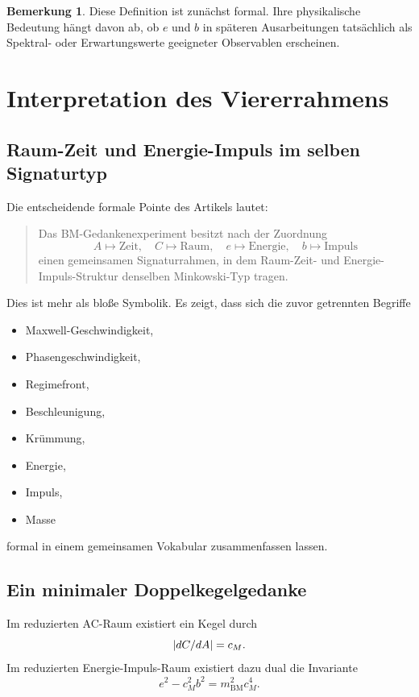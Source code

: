 \documentclass[11pt,a4paper]{article}
\theoremstyle{definition}
\newtheorem{bemerkung}[definition]{Bemerkung}
\theoremstyle{plain}
\begin{document}
	\begin{bemerkung}
		Diese Definition ist zunächst formal. Ihre physikalische Bedeutung hängt davon ab, ob $e$ und $b$ in späteren Ausarbeitungen tatsächlich als Spektral- oder Erwartungswerte geeigneter Observablen erscheinen.
	\end{bemerkung}
	
	\section{Interpretation des Viererrahmens}
	
	\subsection{Raum-Zeit und Energie-Impuls im selben Signaturtyp}
	
	Die entscheidende formale Pointe des Artikels lautet:
	\begin{quote}
		Das BM-Gedankenexperiment besitzt nach der Zuordnung
		\[
		A\mapsto \text{Zeit},\quad C\mapsto \text{Raum},\quad e\mapsto \text{Energie},\quad b\mapsto \text{Impuls}
		\]
		einen gemeinsamen Signaturrahmen, in dem Raum-Zeit- und Energie-Impuls-Struktur denselben Minkowski-Typ tragen.
	\end{quote}
	
	Dies ist mehr als bloße Symbolik. Es zeigt, dass sich die zuvor getrennten Begriffe
	\begin{itemize}[leftmargin=2em]
		\item Maxwell-Geschwindigkeit,
		\item Phasengeschwindigkeit,
		\item Regimefront,
		\item Beschleunigung,
		\item Krümmung,
		\item Energie,
		\item Impuls,
		\item Masse
	\end{itemize}
	formal in einem gemeinsamen Vokabular zusammenfassen lassen.
	
	\subsection{Ein minimaler Doppelkegelgedanke}
	
	Im reduzierten AC-Raum existiert ein Kegel durch
	\[
	\abs{dC/dA} = c_M.
	\]
	Im reduzierten Energie-Impuls-Raum existiert dazu dual die Invariante
	\[
	e^2 - c_M^2 b^2 = m_{\mathrm{BM}}^2 c_M^4.
	\]
	
\end{document}
